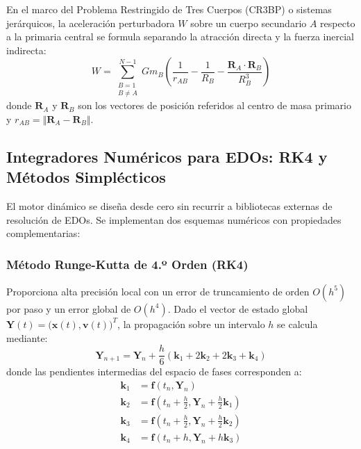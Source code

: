 \documentclass[11pt, a4paper]{article}
\begin{document}
	En el marco del Problema Restringido de Tres Cuerpos (CR3BP) o sistemas jerárquicos, la aceleración perturbadora $W$ sobre un cuerpo secundario $A$ respecto a la primaria central se formula separando la atracción directa y la fuerza inercial indirecta:
	\begin{equation}
		W = \sum_{\substack{B=1 \\ B \neq A}}^{N-1} G m_B \left( \frac{1}{r_{AB}} - \frac{1}{R_B} - \frac{\mathbf{R}_A \cdot \mathbf{R}_B}{R_B^3} \right)
		\label{eq:perturbing_potential}
	\end{equation}
	donde $\mathbf{R}_A$ y $\mathbf{R}_B$ son los vectores de posición referidos al centro de masa primario y $r_{AB} = \Vert{}\mathbf{R}_A - \mathbf{R}_B\Vert{}$.
	
	\subsection{Integradores Numéricos para EDOs: RK4 y Métodos Simplécticos}
	
	El motor dinámico se diseña desde cero sin recurrir a bibliotecas externas de resolución de EDOs. Se implementan dos esquemas numéricos con propiedades complementarias:
	
	\subsubsection{Método Runge-Kutta de 4.º Orden (RK4)}
	Proporciona alta precisión local con un error de truncamiento de orden $O(h^5)$ por paso y un error global de $O(h^4)$. Dado el vector de estado global $\mathbf{Y}(t) = \big(\mathbf{x}(t), \mathbf{v}(t)\big)^T$, la propagación sobre un intervalo $h$ se calcula mediante:
	\begin{equation}
		\mathbf{Y}_{n+1} = \mathbf{Y}_n + \frac{h}{6} \left(\mathbf{k}_1 + 2\mathbf{k}_2 + 2\mathbf{k}_3 + \mathbf{k}_4\right)
	\end{equation}
	donde las pendientes intermedias del espacio de fases corresponden a:
	\begin{align}
		\mathbf{k}_1 &= \mathbf{f}(t_n, \mathbf{Y}_n) \\
		\mathbf{k}_2 &= \mathbf{f}\left(t_n + \frac{h}{2}, \mathbf{Y}_n + \frac{h}{2} \mathbf{k}_1\right) \\
		\mathbf{k}_3 &= \mathbf{f}\left(t_n + \frac{h}{2}, \mathbf{Y}_n + \frac{h}{2} \mathbf{k}_2\right) \\
		\mathbf{k}_4 &= \mathbf{f}(t_n + h, \mathbf{Y}_n + h \mathbf{k}_3)
	\end{align}
	
\end{document}
